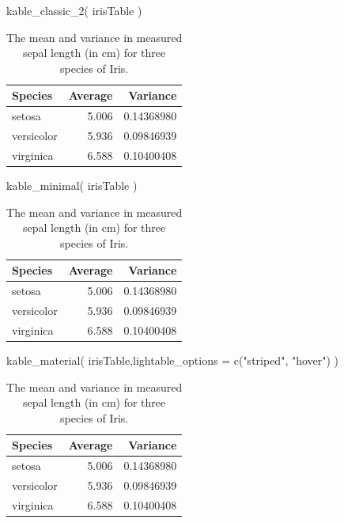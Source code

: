 \documentclass[
  letterpaper,
]{book}
\newenvironment{Shaded}{\begin{snugshade}}{\end{snugshade}}
\newcommand{\AttributeTok}[1]{\textcolor[rgb]{0.40,0.45,0.13}{#1}}
\newcommand{\FunctionTok}[1]{\textcolor[rgb]{0.28,0.35,0.67}{#1}}
\newcommand{\NormalTok}[1]{\textcolor[rgb]{0.00,0.23,0.31}{#1}}
\newcommand{\StringTok}[1]{\textcolor[rgb]{0.13,0.47,0.30}{#1}}
\begin{document}
\begin{Shaded}
\begin{Highlighting}[]
\FunctionTok{kable\_classic\_2}\NormalTok{( irisTable )}
\end{Highlighting}
\end{Shaded}

\begin{longtable}[t]{lrr}
\caption{\label{tab:unnamed-chunk-40}The mean and variance in measured sepal length (in cm) for three species of Iris.}\\
\toprule
Species & Average & Variance\\
\midrule
setosa & 5.006 & 0.14368980\\
versicolor & 5.936 & 0.09846939\\
virginica & 6.588 & 0.10400408\\
\bottomrule
\end{longtable}

\begin{Shaded}
\begin{Highlighting}[]
\FunctionTok{kable\_minimal}\NormalTok{( irisTable )}
\end{Highlighting}
\end{Shaded}

\begin{longtable}[t]{lrr}
\caption{\label{tab:unnamed-chunk-41}The mean and variance in measured sepal length (in cm) for three species of Iris.}\\
\toprule
Species & Average & Variance\\
\midrule
setosa & 5.006 & 0.14368980\\
versicolor & 5.936 & 0.09846939\\
virginica & 6.588 & 0.10400408\\
\bottomrule
\end{longtable}

\begin{Shaded}
\begin{Highlighting}[]
\FunctionTok{kable\_material}\NormalTok{( irisTable,}\AttributeTok{lightable\_options =} \FunctionTok{c}\NormalTok{(}\StringTok{"striped"}\NormalTok{, }\StringTok{"hover"}\NormalTok{) )}
\end{Highlighting}
\end{Shaded}

\begin{longtable}[t]{lrr}
\caption{\label{tab:unnamed-chunk-42}The mean and variance in measured sepal length (in cm) for three species of Iris.}\\
\toprule
Species & Average & Variance\\
\midrule
setosa & 5.006 & 0.14368980\\
versicolor & 5.936 & 0.09846939\\
virginica & 6.588 & 0.10400408\\
\bottomrule
\end{longtable}
\end{document}
